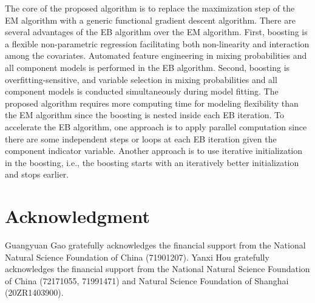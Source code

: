 \documentclass[11pt]{article}
\numberwithin{equation}{section}
\begin{document}
The core of the proposed algorithm is to replace the maximization step of the EM algorithm with a generic functional gradient descent algorithm.
There are several advantages of the EB algorithm over the EM algorithm. 
First, boosting is a flexible non-parametric regression facilitating both {non-linearity  and interaction among the covariates}.  
Automated feature engineering in mixing probabilities and all component models is performed in the EB algorithm.
Second, boosting is {overfitting-sensitive}, and {variable selection} in mixing probabilities and all component models is conducted simultaneously during model fitting.
The proposed algorithm requires more computing time for modeling flexibility than the EM algorithm since the boosting is nested inside each EB iteration.
To accelerate the EB algorithm, 
one approach is to apply parallel computation since there are some independent steps or loops at each EB iteration given the component indicator variable.
Another approach is to use iterative initialization in the boosting, i.e., the boosting starts with an iteratively better initialization and stops earlier.

	\section*{Acknowledgment}
Guangyuan Gao gratefully acknowledges the financial support from the National Natural Science Foundation of China (71901207). Yanxi Hou gratefully acknowledges the financial support from the National Natural Science Foundation of China (72171055, 71991471) and Natural Science Foundation of Shanghai (20ZR1403900).



\end{document}
